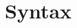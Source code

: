 \section{Syntax}
\newcommand{\sep}{0.5mm}%
\newcommand{\rad}{3.5mm}%
\newcommand{\guillemets}[1]{\guillemotleft#1\guillemotright}
%
%
